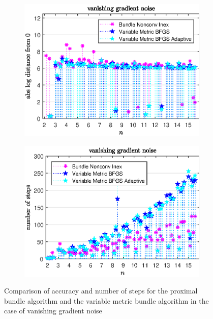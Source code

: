 \vspace{-1.5em}

\begin{figure}[H]
	\begin{subfigure}{0.49\textwidth}
		\includegraphics[width=\textwidth]{Pictures/Plots/vanishing_gradient_noise.eps}%
	\end{subfigure}
	\begin{subfigure}{0.49\textwidth}
		\includegraphics[width=\textwidth]{Pictures/Plots/steps_vanishing_gradient_noise.eps}%
	\end{subfigure}
	\caption[Accuracy and number of steps: vanishing gradient noise]{Comparison of accuracy and number of steps for the proximal bundle algorithm and the variable metric bundle algorithm in the case of vanishing gradient noise}%
	\label{fig_van_grad_noise}%
\end{figure}


